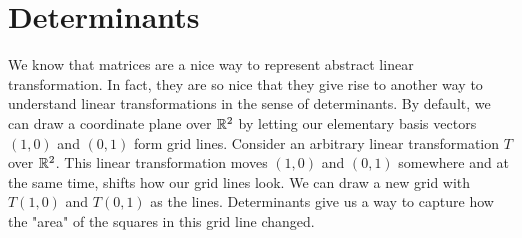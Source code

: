 \chapter{Determinants}

We know that matrices are a nice way to represent abstract linear transformation. In fact, they are so nice that they give rise to another way to understand linear transformations in the sense of determinants. By default, we can draw a coordinate plane over $\mathbb{R}^2$ by letting our elementary basis vectors $(1,0)$ and $(0,1)$ form grid lines. Consider an arbitrary linear transformation $T$ over $\mathbb{R}^2$. This linear transformation moves $(1,0)$ and $(0,1)$ somewhere and at the same time, shifts how our grid lines look. We can draw a new grid with $T(1,0)$ and $T(0,1)$ as the lines. Determinants give us a way to capture how the "area" of the squares in this grid line changed.

